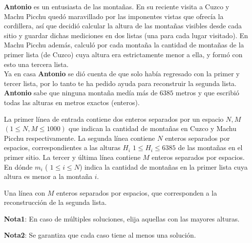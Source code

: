 
\textbf{Antonio} es un entusiasta de las montañas. En su reciente visita a Cuzco y Machu Picchu quedó maravillado por las imponentes vistas que ofrecía la cordillera, así que decidió calcular la altura de las montañas visibles desde cada sitio y guardar dichas mediciones en dos listas (una para cada lugar visitado). En Machu Picchu además, calculó por cada montaña la cantidad de montañas de la primer lista (de Cuzco) cuya altura era estrictamente menor a ella, y formó con esto una tercera lista.
\\
Ya en casa \textbf{Antonio} se dió cuenta de que solo había regresado con la primer y tercer lista, por lo tanto te ha pedido ayuda para reconstruir la segunda lista. \textbf{Antonio} sabe que ninguna montaña medía más de $6385$ metros y que escribió todas las alturas en metros exactos (enteros).


La primer línea de entrada contiene dos enteros separados por un espacio $N, M$ $(1 \le N, M \le 1000)$ que indican la cantidad de montañas en Cuzco y Machu Picchu respectivamente.
La segunda línea contiene $N$ enteros separados por espacios, correspondientes a las alturas $H_i$ $1 \le H_i \le 6385$ de las montañas en el primer sitio.
La tercer y última línea contiene $M$ enteros separados por espacios. En dónde $m_i$ ( $1 \le i \le N$) indica la cantidad de montañas en la primer lista cuya altura es menor a la montaña $i$.

\outputText

Una línea con $M$ enteros separados por espacios, que corresponden a la reconstrucción de la segunda lista.

\textbf{Nota1}: En caso de múltiples soluciones, elija aquellas con las mayores alturas.


\textbf{Nota2}: Se garantiza que cada caso tiene al menos una solución.

\exampleCases

\begin{example}
\end{example}

